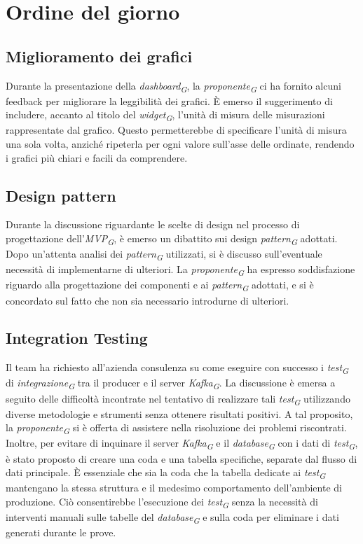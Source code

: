 \documentclass{article}
\begin{document}
\section{Ordine del giorno}
    \subsection{Miglioramento dei grafici}
        Durante la presentazione della \textit{dashboard}\textsubscript{\textit{G}}, la \textit{proponente}\textsubscript{\textit{G}} ci ha fornito alcuni feedback per migliorare la leggibilità dei grafici. È emerso il suggerimento di includere, accanto al titolo del \textit{widget}\textsubscript{\textit{G}}, l'unità di misura delle misurazioni rappresentate dal grafico. Questo permetterebbe di specificare l'unità di misura una sola volta, anziché ripeterla per ogni valore sull'asse delle ordinate, rendendo i grafici più chiari e facili da comprendere.
    \subsection{Design pattern}
        Durante la discussione riguardante le scelte di design nel processo di progettazione dell'\textit{MVP}\textsubscript{\textit{G}}, è emerso un dibattito sui design \textit{pattern}\textsubscript{\textit{G}} adottati. Dopo un'attenta analisi dei \textit{pattern}\textsubscript{\textit{G}} utilizzati, si è discusso sull'eventuale necessità di implementarne di ulteriori. La \textit{proponente}\textsubscript{\textit{G}} ha espresso soddisfazione riguardo alla progettazione dei componenti e ai \textit{pattern}\textsubscript{\textit{G}} adottati, e si è concordato sul fatto che non sia necessario introdurne di ulteriori.
    \subsection{Integration Testing}
        Il team ha richiesto all'azienda consulenza su come eseguire con successo i \textit{test}\textsubscript{\textit{G}} di \textit{integrazione}\textsubscript{\textit{G}} tra il producer e il server \textit{Kafka}\textsubscript{\textit{G}}. La discussione è emersa a seguito delle difficoltà incontrate nel tentativo di realizzare tali \textit{test}\textsubscript{\textit{G}} utilizzando diverse metodologie e strumenti senza ottenere risultati positivi. A tal proposito, la \textit{proponente}\textsubscript{\textit{G}} si è offerta di assistere nella risoluzione dei problemi riscontrati. \\
        Inoltre, per evitare di inquinare il server \textit{Kafka}\textsubscript{\textit{G}} e il \textit{database}\textsubscript{\textit{G}} con i dati di \textit{test}\textsubscript{\textit{G}}, è stato proposto di creare una coda e una tabella specifiche, separate dal flusso di dati principale. È essenziale che sia la coda che la tabella dedicate ai \textit{test}\textsubscript{\textit{G}} mantengano la stessa struttura e il medesimo comportamento dell'ambiente di produzione. Ciò consentirebbe l'esecuzione dei \textit{test}\textsubscript{\textit{G}} senza la necessità di interventi manuali sulle tabelle del \textit{database}\textsubscript{\textit{G}} e sulla coda per eliminare i dati generati durante le prove.
\end{document}
